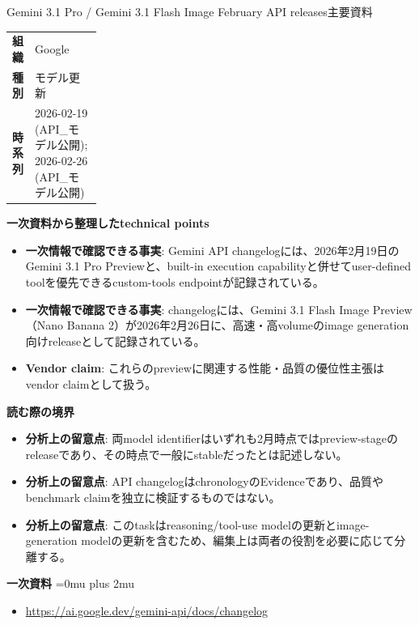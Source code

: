 \begin{technicalnote}{Gemini 3.1 Pro / Gemini 3.1 Flash Image February API releases}{主要資料}
\begingroup
\begin{tabularx}{\linewidth}{@{}>{\bfseries}p{0.22\linewidth}X@{}}
組織 & Google \\
種別 & モデル更新 \\
時系列 & 2026-02-19 (API\_モデル公開); 2026-02-26 (API\_モデル公開) \\
\end{tabularx}
\smallskip
{\bfseries 一次資料から整理したtechnical points}
\begin{itemize}[leftmargin=1.5em,itemsep=0.35em]
\item \textbf{一次情報で確認できる事実}: Gemini API changelogには、2026年2月19日のGemini 3.1 Pro Previewと、built-in execution capabilityと併せてuser-defined toolを優先できるcustom-tools endpointが記録されている。
\item \textbf{一次情報で確認できる事実}: changelogには、Gemini 3.1 Flash Image Preview（Nano Banana 2）が2026年2月26日に、高速・高volumeのimage generation向けreleaseとして記録されている。
\item \textbf{Vendor claim}: これらのpreviewに関連する性能・品質の優位性主張はvendor claimとして扱う。
\end{itemize}
\begin{minipage}{\linewidth}
{\bfseries 読む際の境界}
\begin{itemize}[leftmargin=1.5em,itemsep=0.35em]
\item \textbf{分析上の留意点}: 両model identifierはいずれも2月時点ではpreview-stageのreleaseであり、その時点で一般にstableだったとは記述しない。
\item \textbf{分析上の留意点}: API changelogはchronologyのEvidenceであり、品質やbenchmark claimを独立に検証するものではない。
\item \textbf{分析上の留意点}: このtaskはreasoning/tool-use modelの更新とimage-generation modelの更新を含むため、編集上は両者の役割を必要に応じて分離する。
\end{itemize}
\begin{samepage}
{\bfseries 一次資料}
\begingroup\sloppy
\Urlmuskip=0mu plus 2mu\relax
\begin{itemize}[leftmargin=1.5em,itemsep=0.25em]
\item {\scriptsize\url{https://ai.google.dev/gemini-api/docs/changelog}}
\end{itemize}
\endgroup
\end{samepage}
\end{minipage}
\endgroup
\end{technicalnote}
\medskip

